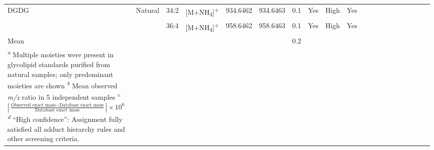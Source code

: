 \begin{landscape}
\begin{footnotesize}
\begin{singlespace}
\begin{longtable}{ Lp{.08\linewidth} Lp{.07\linewidth} Lp{.07\linewidth} Lp{.08\linewidth} Lp{.08\linewidth} Lp{.08\linewidth} Lp{.08\linewidth} Lp{.08\linewidth} Lp{.11\linewidth} Lp{.1\linewidth} }
DGDG & Natural & 34:2 & {[}M+NH\textsubscript{4}{]}\textsuperscript{+} & 934.6462 & 934.6463 & 0.1 & Yes & High & Yes \\

 &  & 36:4 & {[}M+NH\textsubscript{4}{]}\textsuperscript{+} & 958.6462 & 958.6463 & 0.1 & Yes & High & Yes \\

Mean &  &  &  &  &  & 0.2 &  &  & \\
\bottomrule
{}
\caption*{\emph{\textsuperscript{a}} Multiple moieties were present in glycolipid standards purified from natural samples; only predominant moieties are shown\\
\emph{\textsuperscript{b}} Mean observed \emph{m/z} ratio in 5 independent samples\\
\emph{\textsuperscript{c}} $\left| {\frac{{{\text{Observed exact mass}} - {\text{Database exact mass}}}}{{{\text{Database exact mass}}}}} \right| \times {10^6}$\\
\emph{\textsuperscript{d}} ``High confidence'': Assignment fully satisfied all adduct hierarchy rules and other screening criteria.
}
\end{longtable}
\end{singlespace}
\end{footnotesize}
\end{landscape}

\clearpage

